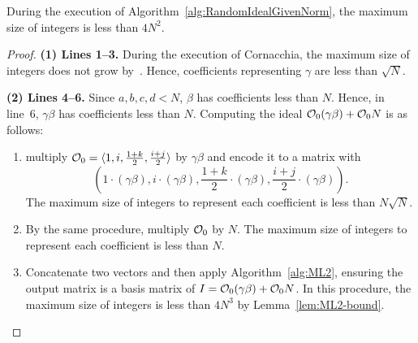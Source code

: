 
\begin{lemma}
\label{lem:RandomIdealGivenNorm-bound}
During the execution of Algorithm~\ref{alg:RandomIdealGivenNorm}, the maximum size of integers is less than $4N^2$.
\end{lemma}

\begin{proof}
\noindent\textbf{(1) Lines 1--3.}
During the execution of \textsf{Cornacchia}, the maximum size of integers does not grow by~\cite[Lemma~18]{KLKL25}.
Hence, coefficients representing $\gamma$ are less than $\sqrt{N}$.

\smallskip
\noindent\textbf{(2) Lines 4--6.}
Since $a,b,c,d < N$, $\beta$ has coefficients less than $N$.
Hence, in line~6, $\gamma\beta$ has coefficients less than $N$.
Computing the ideal $\mathcal{O}_0(\gamma\beta)+\mathcal{O}_0 N$ is as follows:
\begin{enumerate}
    \item multiply $\mathcal{O}_0=\langle 1,i,\frac{1+k}{2},\frac{i+j}{2} \rangle$ by $\gamma\beta$ and encode it to a matrix with \[\left(1\cdot(\gamma\beta), i\cdot(\gamma\beta), \frac{1+k}{2}\cdot(\gamma\beta), \frac{i+j}{2}\cdot(\gamma\beta)\right).\] The maximum size of integers to represent each coefficient is less than $N\sqrt{N}$.
    \item By the same procedure, multiply $\mathcal{O}_0$ by $N$. The maximum size of integers to represent each coefficient is less than $N$.
    \item Concatenate two vectors and then apply Algorithm~\ref{alg:ML2}, ensuring the output matrix is a basis matrix of $I=\mathcal{O}_0(\gamma\beta)+\mathcal{O}_0 N$. In this procedure, the maximum size of integers is less than $4N^3$ by Lemma~\ref{lem:ML2-bound}.
\end{enumerate}
\end{proof}



